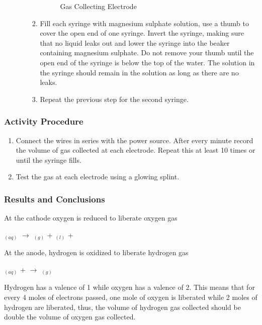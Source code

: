 \begin{enumerate}
\begin{enumerate}
\begin{enumerate}
{\begin{figure}[h]
\begin{center}
\def\svgwidth{200pt}

\caption{Gas Collecting Electrode}
\label{fig:gas collecting electrode}
\end{center}
\end{figure}}

\item{Fill each syringe with magnesium sulphate solution, use a thumb to cover the open end of one syringe. Invert the syringe, making sure that no liquid leaks out and lower the syringe into the beaker containing magnesium sulphate. Do not remove your thumb until the open end of the syringe is below the top of the water. The solution in the syringe should remain in the solution as long as there are no leaks.}
\item{Repeat the previous step for the second syringe.}
\end{enumerate}
\end{enumerate}
\end{enumerate}

\subsubsection*{Activity Procedure}
\begin{enumerate}
\item{Connect the wires in series with the power source. After every minute record the volume of gas collected at each electrode. Repeat this at least 10 times or until the syringe fills.}
\item{Test the gas at each electrode using a glowing splint.}
\end{enumerate}

\subsubsection*{Results and Conclusions}
At the cathode oxygen is reduced to liberate oxygen gas\\
\begin{center}
$_{(aq)}$ $\longrightarrow$ $_{(g)}$ + $_{(l)}$ + \\
\end{center}
At the anode, hydrogen is oxidized to liberate hydrogen gas\\
\begin{center}
$_{(aq)}$ +  $\longrightarrow$ $_{(g)}$\\
\end{center}
Hydrogen has a valence of 1 while oxygen has a valence of 2. This means that for every 4 moles of electrons passed, one mole of oxygen is liberated while 2 moles of hydrogen are liberated, thus, the volume of hydrogen gas collected should be double the volume of oxygen gas collected.

